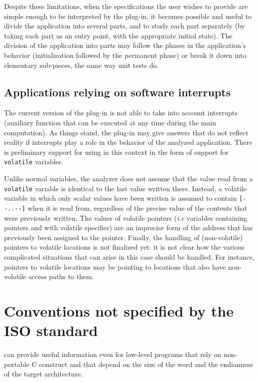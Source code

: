 \documentclass{frama-c-book}
\begin{document}
Despite these limitations, when the specifications the user wishes to
provide are simple enough to be interpreted by the plug-in, it becomes
possible and useful to divide the application into several parts, and
to study each part separately (by taking each part as an entry point,
with the appropriate initial state). The division of the application
into parts may follow the phases in the application's behavior
(initialization followed by the permanent phase)
or break it down into elementary sub-pieces, the same way unit tests do.

\subsection{Applications relying on software interrupts}

The current version of the \Eva{} plug-in is not able to
take into account
interrupts (auxiliary function that can be executed at any time
during the main computation). As things stand, the plug-in may give
answers that do not reflect reality if interrupts play a role
in the behavior of the analyzed application.
There is preliminary support for using \Eva{} in this
context in the form of support for \lstinline|volatile| variables.

Unlike normal variables, the analyzer does not assume that
the value read from a \lstinline|volatile|
variable is identical to the last value written there. Instead,
a volatile variable in which only scalar values have been written
is assumed to contain \lstinline|[--..--]| when it is read from,
regardless of the precise value of the contents
that were previously written.
%
The values of volatile pointers ({\it i.e} variables containing pointers and
with volatile specifier)
are an imprecise form of the address that has previously been assigned to
the pointer. Finally, the handling of (non-volatile) pointers to volatile
locations is not finalized yet: it is not clear how the various complicated
situations that can arise in this case should be handled. For instance,
pointers to volatile locations may be pointing to locations that
also have non-volatile access paths to them.

\section{Conventions not specified by the ISO standard}

\Eva{} can provide useful information even for low-level
programs that rely on non-portable C construct and that depend
on the size of the word and the endianness of the target architecture.
\end{document}
